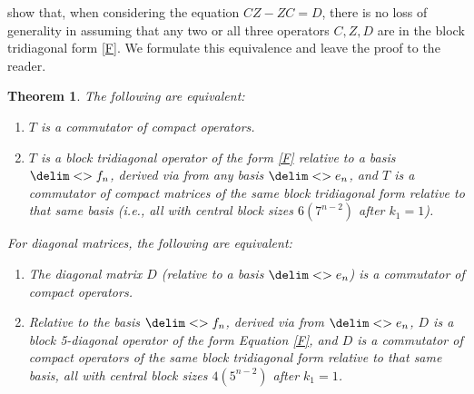 \documentclass[10pt,reqno]{amsart}
\newtheorem{theorem}{Theorem}[section]
\theoremstyle{remark}
\newcommand{\seq}{\delim<>}
\numberwithin{equation}{section}
\begin{document}
 show that, when considering the equation $CZ-ZC=D$, there is no loss of generality in assuming that any two or all three operators $C,Z,D$ are in the block tridiagonal form  \eqref{F}.
We formulate this equivalence and leave the proof to the reader.

\begin{theorem}
  \label{equivthm}
  The following are equivalent:
  \begin{enumerate}
  \item $T$ is a commutator of compact operators.
  \item $T$ is a block tridiagonal operator of the form \eqref{F} relative to a basis $\seq{f_n}$, derived via  from any basis $\seq{e_n}$, and $T$ is a commutator of compact matrices of the same block tridiagonal form relative to that same basis (i.e., all with central block sizes  $6 (7^{n-2})$ after $k_1=1$).
  \end{enumerate}
  For diagonal matrices, the following are equivalent:
  \begin{enumerate}[resume]
  \item The diagonal matrix $D$ (relative to a basis $\seq{e_n}$) is a commutator of compact operators.
  \item Relative to the basis $\seq{f_n}$, derived via  from $\seq{e_n}$, $D$ is a block 5-diagonal operator of the form Equation \eqref{F}, and $D$ is a commutator of compact operators of the same block tridiagonal form relative to that same basis, all with central block sizes  $4 (5^{n-2})$ after $k_1=1$.
  \end{enumerate}
\end{theorem}
\end{document}
